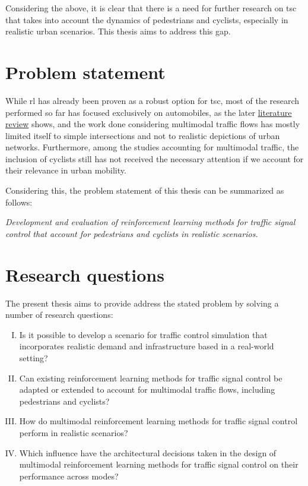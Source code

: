 \medskip

\noindent Considering the above, it is clear that there is a need for further research on \gls{tsc} that takes into account the dynamics of pedestrians and cyclists, especially in realistic urban scenarios. This thesis aims to address this gap.

\section{Problem statement}

While \acrfull{rl} has already been proven as a robust option for \acrfull{tsc}, most of the research performed so far has focused exclusively on automobiles, as the later \hyperref[sec:lit_review]{literature review} shows, and the work done considering multimodal traffic flows has mostly limited itself to simple intersections and not to realistic depictions of urban networks. Furthermore, among the studies accounting for multimodal traffic, the inclusion of cyclists still has not received the necessary attention if we account for their relevance in urban mobility.

\medskip

\noindent Considering this, the problem statement of this thesis can be summarized as follows:

\indent \textit{Development and evaluation of reinforcement learning methods for traffic signal control that account for pedestrians and cyclists in realistic scenarios.}

\section{Research questions}\label{sec:rqs}

The present thesis aims to provide address the stated problem by solving a number of research questions:

\begin{enumerate}[I.]
   \item Is it possible to develop a scenario for traffic control simulation that incorporates realistic demand and infrastructure based in a real-world setting?
   \item Can existing reinforcement learning methods for traffic signal control be adapted or extended to account for multimodal traffic flows, including pedestrians and cyclists?
   \item How do multimodal reinforcement learning methods for traffic signal control perform in realistic scenarios?
   \item Which influence have the architectural decisions taken in the design of multimodal reinforcement learning methods for traffic signal control on their performance across modes?
\end{enumerate}

